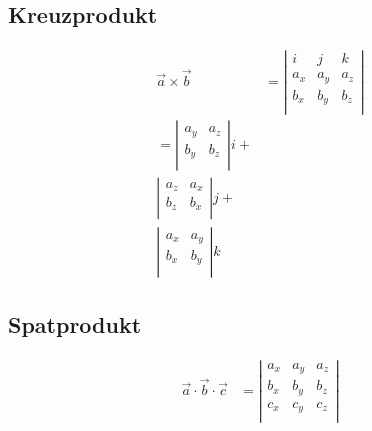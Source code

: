 \subsection{Kreuzprodukt}
\begin{align*}
 \vec{a} \times \vec{b} &= \left|
                               \begin{array}{ccc}
                                  i & j & k \\
                                  a_x & a_y & a_z \\
                                  b_x & b_y & b_z \\
                               \end{array}
                               \right|\\
                         =   \left|
                              \begin{array}{ccc}
                                 a_y & a_z  \\
                                 b_y & b_z \\
                              \end{array}
                              \right|i + \\
                              \left|
                              \begin{array}{ccc}
                                 a_z & a_x  \\
                                 b_z & b_x \\
                              \end{array}
                              \right|j + \\
                             \left|
                             \begin{array}{ccc}
                                a_x & a_y  \\
                                b_x & b_y \\
                             \end{array}
                             \right|k
\end{align*}

\subsection{Spatprodukt}
\begin{align*}
 \vec{a} \cdot \vec{b} \cdot \vec{c} &=    \left|
                                           \begin{array}{ccc}
                                              a_x & a_y & a_z \\
                                              b_x & b_y & b_z \\
                                              c_x & c_y & c_z \\
                                           \end{array}
                                           \right|\\
\end{align*}




